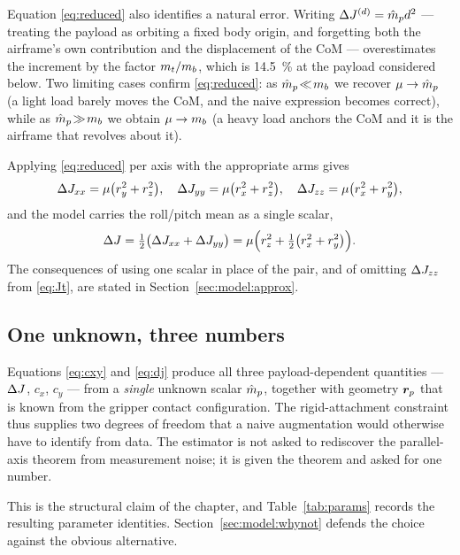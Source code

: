 Equation \eqref{eq:reduced} also identifies a natural error. Writing
$\Delta J^{(d)} = \hat{m}_p d^2$ --- treating the payload as orbiting a fixed
body origin, and forgetting both the airframe's own contribution and the
displacement of the CoM --- overestimates the increment by the factor
$m_t / m_b$, which is \SI{14.5}{\percent} at the payload considered
below. Two limiting cases confirm \eqref{eq:reduced}: as
$\hat{m}_p \!\ll\! m_b$ we recover $\mu \to \hat{m}_p$ (a light load barely moves
the CoM, and the naive expression becomes correct), while as
$\hat{m}_p \!\gg\! m_b$ we obtain $\mu \to m_b$ (a heavy load anchors the CoM
and it is the airframe that revolves about it).

Applying \eqref{eq:reduced} per axis with the appropriate arms gives
\begin{equation}
\Delta J_{xx} = \mu\bigl(r_y^2 + r_z^2\bigr), \quad
\Delta J_{yy} = \mu\bigl(r_x^2 + r_z^2\bigr), \quad
\Delta J_{zz} = \mu\bigl(r_x^2 + r_y^2\bigr),
\label{eq:djaxes}
\end{equation}
and the model carries the roll/pitch mean as a single scalar,
\begin{equation}
\Delta J = \tfrac{1}{2}\bigl(\Delta J_{xx} + \Delta J_{yy}\bigr)
    = \mu\Bigl( r_z^2 + \tfrac{1}{2}\bigl(r_x^2 + r_y^2\bigr) \Bigr).
\label{eq:dj}
\end{equation}
The consequences of using one scalar in place of the pair, and of
omitting $\Delta J_{zz}$ from \eqref{eq:Jt}, are stated in
Section~\ref{sec:model:approx}.

\subsection{One unknown, three numbers}\label{sec:model:onescalar}

Equations \eqref{eq:cxy} and \eqref{eq:dj} produce all three
payload-dependent quantities --- $\Delta J$, $c_x$, $c_y$ --- from a
\emph{single} unknown scalar $\hat{m}_p$, together with geometry $\bm{r}_p$ that
is known from the gripper contact configuration. The rigid-attachment
constraint thus supplies two degrees of freedom that a naive augmentation
would otherwise have to identify from data. The estimator is not asked to
rediscover the parallel-axis theorem from measurement noise; it is given
the theorem and asked for one number.

This is the structural claim of the chapter, and
Table~\ref{tab:params} records the resulting parameter identities.
Section~\ref{sec:model:whynot} defends the choice against the obvious
alternative.

